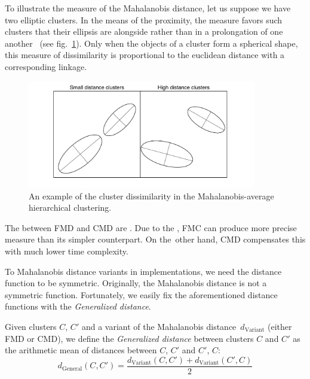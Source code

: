To illustrate the measure of the Mahalanobis distance, let us suppose we have two elliptic clusters. In the means of the proximity, the measure favors such clusters that their ellipsis are alongside rather than in a prolongation of one another~\cite{dagnelie1991using} (see fig.~\ref{fig01:ellipses}). Only when the objects of a cluster form a spherical shape, this measure of dissimilarity is proportional to the euclidean distance with a corresponding linkage.

\begin{figure}\centering
	\includegraphics[width=10cm]{img/ellipses}
	\caption{An example of the cluster dissimilarity in the Mahalanobis-average hierarchical clustering.}
	\label{fig01:ellipses}
\end{figure}



The  between FMD and CMD are . Due to the , FMC can produce more precise measure than its simpler counterpart. On the~other hand, CMD compensates this with much lower time complexity.

To  Mahalanobis distance variants in  implementations, we need the distance function to be symmetric. Originally, the Mahalanobis distance is not a symmetric function. Fortunately, we easily fix the aforementioned distance functions with the \emph{Generalized distance}.

\begin{defn}
	Given clusters $C$, $C'$ and a variant of the Mahalanobis distance~$d_\text{Variant}$ (either FMD or CMD), we define the \emph{Generalized distance} between clusters $C$ and $C'$ as the arithmetic mean of distances between $C$, $C'$ and $C'$, $C$:
	$$d_\text{General}(C,C') = \frac{d_\text{Variant}(C,C')+d_\text{Variant}(C',C)}{2}$$
	\label{def01:gene}
\end{defn}  


